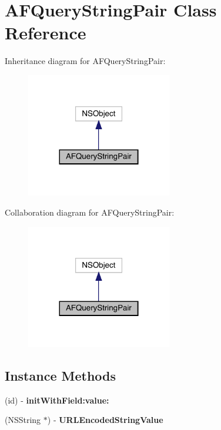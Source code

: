 \hypertarget{interface_a_f_query_string_pair}{}\section{A\+F\+Query\+String\+Pair Class Reference}
\label{interface_a_f_query_string_pair}


Inheritance diagram for A\+F\+Query\+String\+Pair\+:\nopagebreak
\begin{figure}[H]
\begin{center}
\leavevmode
\includegraphics[width=180pt]{interface_a_f_query_string_pair__inherit__graph}
\end{center}
\end{figure}


Collaboration diagram for A\+F\+Query\+String\+Pair\+:\nopagebreak
\begin{figure}[H]
\begin{center}
\leavevmode
\includegraphics[width=180pt]{interface_a_f_query_string_pair__coll__graph}
\end{center}
\end{figure}
\subsection*{Instance Methods}
\begin{DoxyCompactItemize}
\item 
\mbox{\label{interface_a_f_query_string_pair_a2a8c9d6aae50a33dc0f9b7150eace466}} 
(id) -\/ {\bfseries init\+With\+Field\+:value\+:}
\item 
\mbox{\label{interface_a_f_query_string_pair_a1d7ab3321b75b34205200a599299caac}} 
(N\+S\+String $\ast$) -\/ {\bfseries U\+R\+L\+Encoded\+String\+Value}
\end{DoxyCompactItemize}
